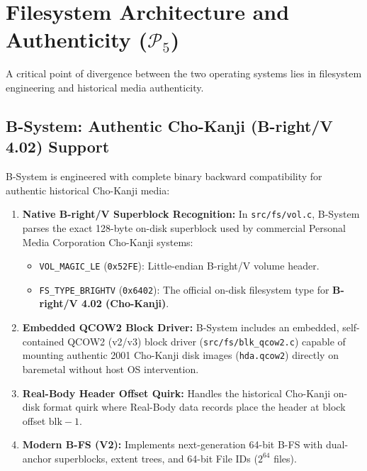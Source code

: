 \documentclass[10pt,journal,compsoc,twocolumn]{article}
\begin{document}
\section{Filesystem Architecture and Authenticity ($\mathcal{P}_5$)}
\label{sec:fs}

A critical point of divergence between the two operating systems lies in filesystem engineering and historical media authenticity.

\subsection{B-System: Authentic Cho-Kanji (B-right/V 4.02) Support}
B-System is engineered with complete binary backward compatibility for authentic historical Cho-Kanji media:
\begin{enumerate}[leftmargin=*]
    \item \textbf{Native B-right/V Superblock Recognition:} In \texttt{src/fs/vol.c}, B-System parses the exact 128-byte on-disk superblock used by commercial Personal Media Corporation Cho-Kanji systems:
    \begin{itemize}
        \item \texttt{VOL\_MAGIC\_LE} (\texttt{0x52FE}): Little-endian B-right/V volume header.
        \item \texttt{FS\_TYPE\_BRIGHTV} (\texttt{0x6402}): The official on-disk filesystem type for \textbf{B-right/V 4.02 (Cho-Kanji)}.
    \end{itemize}
    \item \textbf{Embedded QCOW2 Block Driver:} B-System includes an embedded, self-contained QCOW2 (v2/v3) block driver (\texttt{src/fs/blk\_qcow2.c}) capable of mounting authentic 2001 Cho-Kanji disk images (\texttt{hda.qcow2}) directly on baremetal without host OS intervention.
    \item \textbf{Real-Body Header Offset Quirk:} Handles the historical Cho-Kanji on-disk format quirk where Real-Body data records place the header at block offset $\text{blk} - 1$.
    \item \textbf{Modern B-FS (V2):} Implements next-generation 64-bit B-FS with dual-anchor superblocks, extent trees, and 64-bit File IDs ($2^{64}$ files).
\end{enumerate}
\end{document}
